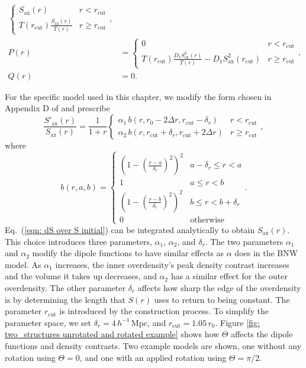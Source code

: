 \documentclass[a4paper,12pt]{report}
\renewcommand{\eqref}[1]{Eq.~({#1})}
\begin{document}
\begin{enumerate}
\begin{subequations}
\begin{align}
\begin{cases}
            S_\text{ax}(r) & r < r_\text{cut} \\
            T(r_\text{cut})\frac{S_\text{ax}(r)}{T(r)}  & r \geq r_\text{cut}
        \end{cases}, \\
        P(r) &=
        \begin{cases}
            0 & r < r_\text{cut} \\
            T(r_\text{cut})\frac{D_1 S_\text{ax}^2(r)}{T(r)} - D_1 S_\text{ax}^2(r_\text{cut}) & r \geq r_\text{cut}
        \end{cases}, \\
        Q(r) &= 0.
    \end{align}
    \end{subequations}
\end{enumerate}

For the specific model used in this chapter, we modify the form chosen in Appendix D of \cite{RN1} and prescribe
\begin{equation}\label{eqn: dS over S initial}
    \frac{S'_\text{ax} (r)}{S_\text{ax}(r)} = \frac{1}{1+r}
    \begin{cases}
        \alpha_1\, b(r, r_0-2\Delta r, r_\text{cut} - \delta_r) & r < r_\text{cut} \\
        \alpha_2\, b(r, r_\text{cut} + \delta_r, r_\text{cut} + 2\Delta r) & r \geq r_\text{cut}
    \end{cases},
\end{equation}
where
\begin{equation}
    b(r,a,b) =
    \begin{cases}
        \left(1-\left(\frac{r-a}{\delta_r}\right)^2\right)^2 &
            a-\delta_r \leq r < a \\
        1 & a \leq r < b \\
        \left(1-\left(\frac{r-b}{\delta_r}\right)^2\right)^2 &
            b \leq r < b+\delta_r \\
        0 & \text{otherwise}
    \end{cases}.
\end{equation}
\eqref{\ref{eqn: dS over S initial}} can be integrated analytically to obtain $S_\text{ax}(r)$. This choice introduces three parameters, $\alpha_1$, $\alpha_2$, and $\delta_r$. The two parameters $\alpha_1$ and $\alpha_2$ modify the dipole functions to have similar effects as $\alpha$ does in the BNW model. As $\alpha_1$ increases, the inner overdensity's peak density contrast increases and the volume it takes up decreases, and $\alpha_2$ has a similar effect for the outer overdensity. The other parameter $\delta_r$ affects how sharp the edge of the overdensity is by determining the length that $S(r)$ uses to return to being constant.
The parameter $r_\text{cut}$ is introduced by the construction process. To simplify the parameter space, we set $\delta_r = 4\, h^{-1}\,$Mpc, and $r_\text{cut} = 1.05\, r_0$. Figure \ref{fig: two_structures unrotated and rotated example} shows how $\Theta$ affects the dipole functions and density contrasts. Two example models are shown, one without any rotation using $\Theta=0$, and one with an applied rotation using $\Theta = \pi/2$.
\end{document}
